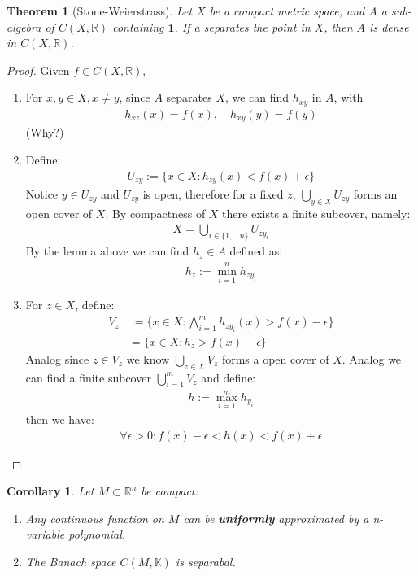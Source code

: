 \documentclass[12pt,fleqn]{book}
\newtheorem{theorem}{Theorem}[section]
\newtheorem{corollary}{Corollary}[theorem]
\theoremstyle{definition}
\begin{document}
\begin{theorem}[Stone-Weierstrass]
	Let $X$ be a compact metric space, and $A$ a sub-algebra of $C(X, \mathbb{R})$ containing $\mathbf{1}$. If a separates the point in $X$, then $A$ is dense in $C(X, \mathbb{R})$.
\end{theorem}
\begin{proof}
	Given $f \in C(X, \mathbb{R})$, 
	\begin{enumerate}
		\item For $x, y \in X, x \neq y$, since $A$ separates $X$, we can find $h_{xy}$ in $A$, with
		\begin{align*}
			h_{xz}(x) = f(x), \quad h_{xy}(y) = f(y)
		\end{align*}
		(Why?)
		\item Define:
		\begin{align*}
			U_{zy}:= \bigg\{ x \in X: h_{zy}(x) < f(x) + \epsilon \bigg\}
		\end{align*}
		Notice $y \in U_{zy}$ and $U_{zy}$ is open, therefore for a fixed $z$, $\bigcup_{y \in X} U_{zy}$ forms an open cover of $X$. By compactness of $X$ there exists a finite subcover, namely:
		\begin{align*}
			X = \bigcup_{i \in \{1, \dots n\}} U_{zy_i}
		\end{align*}
		By the lemma above we can find $h_{z} \in A$ defined as:
		\begin{align*}
			h_z:= \min_{i = 1}^n h_{z y_i}
		\end{align*}
		\item For $z \in X$, define:
		\begin{align*}
			V_z&:= \bigg\{ x \in X: \bigwedge_{i = 1}^m h_{zy_i}(x) > f(x) - \epsilon \bigg\}\\
			&= \bigg\{ x \in X: h_z > f(x) - \epsilon \bigg\}
		\end{align*}
		Analog since $z \in V_z$ we know $\bigcup_{z \in X} V_z$ forms a open cover of $X$. Analog we can find a finite subcover $\bigcup_{i = 1}^m V_z$ and define:
		\begin{align*}
			h:= \max_{i = 1}^m h_{y_i} 
		\end{align*}
		then we have:
		\begin{align*}
			\forall \epsilon > 0: f(x) - \epsilon < h(x) < f(x) + \epsilon
		\end{align*}
	\end{enumerate}
\end{proof}

\begin{corollary}
	Let $M \subset \mathbb{R}^n$ be compact:
	\begin{enumerate}
		\item Any continuous function on $M$ can be \textbf{uniformly} approximated by a n-variable polynomial.
		\item The Banach space $C(M, \mathbb{K})$ is separabal.
	\end{enumerate}
\end{corollary}
\end{document}
